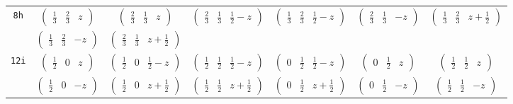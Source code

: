 \documentclass[fleqn,9pt,landscape]{jsarticle}
\begin{document}
\begin{center}
\begin{longtable}{ccccccc}
{\tt 8h} & $ \begin{pmatrix} \frac{1}{3} & \frac{2}{3} & z \end{pmatrix} $ & $ \begin{pmatrix} \frac{2}{3} & \frac{1}{3} & z \end{pmatrix} $ & $ \begin{pmatrix} \frac{2}{3} & \frac{1}{3} & \frac{1}{2} - z \end{pmatrix} $ & $ \begin{pmatrix} \frac{1}{3} & \frac{2}{3} & \frac{1}{2} - z \end{pmatrix} $ & $ \begin{pmatrix} \frac{2}{3} & \frac{1}{3} & - z \end{pmatrix} $ & $ \begin{pmatrix} \frac{1}{3} & \frac{2}{3} & z + \frac{1}{2} \end{pmatrix} $ \\
& $ \begin{pmatrix} \frac{1}{3} & \frac{2}{3} & - z \end{pmatrix} $ & $ \begin{pmatrix} \frac{2}{3} & \frac{1}{3} & z + \frac{1}{2} \end{pmatrix} $ & $  $ & $  $ & $  $ & $  $ \\ \hline
{\tt 12i} & $ \begin{pmatrix} \frac{1}{2} & 0 & z \end{pmatrix} $ & $ \begin{pmatrix} \frac{1}{2} & 0 & \frac{1}{2} - z \end{pmatrix} $ & $ \begin{pmatrix} \frac{1}{2} & \frac{1}{2} & \frac{1}{2} - z \end{pmatrix} $ & $ \begin{pmatrix} 0 & \frac{1}{2} & \frac{1}{2} - z \end{pmatrix} $ & $ \begin{pmatrix} 0 & \frac{1}{2} & z \end{pmatrix} $ & $ \begin{pmatrix} \frac{1}{2} & \frac{1}{2} & z \end{pmatrix} $ \\
& $ \begin{pmatrix} \frac{1}{2} & 0 & - z \end{pmatrix} $ & $ \begin{pmatrix} \frac{1}{2} & 0 & z + \frac{1}{2} \end{pmatrix} $ & $ \begin{pmatrix} \frac{1}{2} & \frac{1}{2} & z + \frac{1}{2} \end{pmatrix} $ & $ \begin{pmatrix} 0 & \frac{1}{2} & z + \frac{1}{2} \end{pmatrix} $ & $ \begin{pmatrix} 0 & \frac{1}{2} & - z \end{pmatrix} $ & $ \begin{pmatrix} \frac{1}{2} & \frac{1}{2} & - z \end{pmatrix} $ \\ \hline

\end{longtable}
\end{center}
\end{document}

